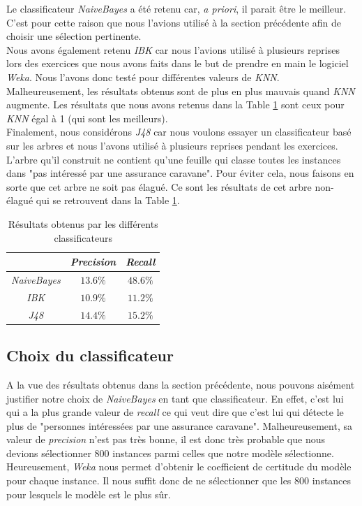 \documentclass[11pt,a4paper]{article}
\begin{document}
				Le classificateur \textit{NaiveBayes} a été retenu car, \textit{a priori}, il parait être le meilleur. C'est pour cette raison que nous l'avions utilisé à la section précédente afin de choisir une sélection pertinente.\\
				
				Nous avons également retenu \textit{IBK} car nous l'avions utilisé à plusieurs reprises lors des exercices que nous avons faits dans le but de prendre en main le logiciel \textit{Weka}. Nous l'avons donc testé pour différentes valeurs de \textit{KNN}. Malheureusement, les résultats obtenus sont de plus en plus mauvais quand \textit{KNN} augmente. Les résultats que nous avons retenus dans la Table \ref{tab:classificateur} sont ceux pour \textit{KNN} égal à 1 (qui sont les meilleurs).\\
				
				Finalement, nous considérons \textit{J48} car nous voulons essayer un classificateur basé sur les arbres et nous l'avons utilisé à plusieurs reprises pendant les exercices. L'arbre qu'il construit ne contient qu'une feuille qui classe toutes les instances dans "pas intéressé par une assurance caravane". Pour éviter cela, nous faisons en sorte que cet arbre ne soit pas élagué. Ce sont les résultats de cet arbre non-élagué qui se retrouvent dans la Table \ref{tab:classificateur}.		
				
				
				\begin{table}[h]
					\centering
					\caption{Résultats obtenus par les différents classificateurs}
					\label{tab:classificateur}
					\begin{tabular}{|c|c|c|}
						\hline
						& \textit{Precision} & \textit{Recall} \\
						\hline
						\textit{NaiveBayes} & $13.6\%$ & $48.6\%$\\
						\hline
						\textit{IBK} & $10.9\%$ & $11.2\%$\\
						\hline
						\textit{J48} & $14.4\%$ & $15.2\%$\\
						\hline
					\end{tabular}
				\end{table}
				
			\subsection{Choix du classificateur}
          	
	          	A la vue des résultats obtenus dans la section précédente, nous pouvons aisément justifier notre choix de \textit{NaiveBayes} en tant que classificateur. En effet, c'est lui qui a la plus grande valeur de \textit{recall} ce qui veut dire que c'est lui qui détecte le plus de "personnes intéressées par une assurance caravane". Malheureusement, sa valeur de \textit{precision} n'est pas très bonne, il est donc très probable que nous devions sélectionner 800 instances parmi celles que notre modèle sélectionne. Heureusement, \textit{Weka} nous permet d'obtenir le coefficient de certitude du modèle pour chaque instance. Il nous suffit donc de ne sélectionner que les 800 instances pour lesquels le modèle est le plus sûr.
	          
\end{document}
